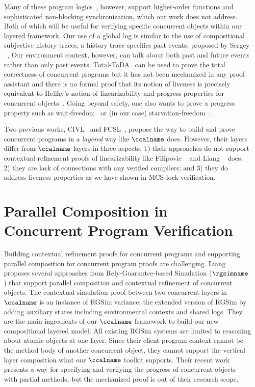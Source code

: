 Many of these program logics~\cite{Turon13popl,iris15}, however, support 
higher-order functions 
and sophisticated non-blocking synchronization,
which our work does not address.
Both of which will be
useful for verifying specific concurrent objects within our layered
framework. 
Our use of a global log is similar to the use of compositional
subjective history traces, a history trace specifies past events, proposed by Sergey \etal~\cite{sergey15},
Our environment context, however, can talk about both past and future events rather than only past events.
Total-TaDA~\cite{pinto16} can be used to prove
the total correctness of concurrent programs but it has not been
mechanized in any proof assistant and there is no formal proof that
its notion of liveness is precisely equivalent to Helihy's notion of
linearizability and progress properties for concurrent
objects~\cite{Herlihy08book}. 
Going
beyond safety, one also wants to prove a progress property such as
wait-freedom~\cite{herlihy91:waitfree} or (in our case)
starvation-freedom~\cite{Herlihy08book}.

Two previous works, CIVL~\cite{civl15} and FCSL~\cite{sergey15pldi},
propose the way to build and prove concurrent programs in a \textit{layered} way like $\ccalname$ does. 
However, their layers differ from $\ccalname$ layers in three aspects;
1) their approaches do not support contextual refinement proofs of linearizability like Filipovic \etal~\cite{filipovic10} and Liang \etal~\cite{liang13} does;
2) they are lack of connections with any verified compilers; and
3) they do address liveness properties as we have shown in MCS lock verification.



\section{Parallel Composition in Concurrent Program Verification}
\label{chatper:related:sec:parallel-composition-in-concurrent-program-verification}

Building contextual refinement proofs for concurrent programs and supporting parallel composition for concurrent program proofs 
are challenging.
Liang \etal~\cite{RGSim,Liang14lics,lili16, liang:2017} 
proposes several approaches from Rely-Guarantee-based Simulation ($\rgsimname$) 
that support parallel
composition and  contextual refinement of concurrent
objects.
The contextual simulation proof between two concurrent layers in $\ccalname$ 
is an instance of RGSim variance; the extended version of RGSim by adding auxiliary states including environmental contexts and shared logs. 
They are the main ingredients of our $\ccalname$ framework 
to build our new  compositional
layered model.
All existing RGSim systems are limited to reasoning
about atomic objects at one layer.
Since their client program context cannot 
be the method body of another concurrent object, 
they cannot
support the vertical layer composition what our $\ccalname$ toolkit supports.
Their recent work \etal~\cite{liang:2017} presents a way for specifying and verifying the progress of concurrent objects with partial methods, but the mechanized proof is out of their research scope. 

